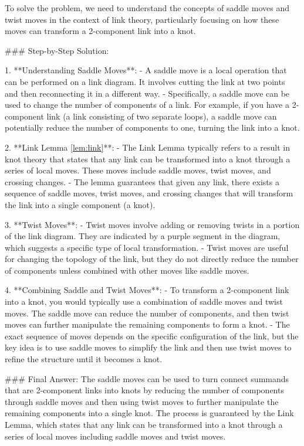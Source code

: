 To solve the problem, we need to understand the concepts of saddle moves and twist moves in the context of link theory, particularly focusing on how these moves can transform a 2-component link into a knot.

### Step-by-Step Solution:

1. **Understanding Saddle Moves**:
   - A saddle move is a local operation that can be performed on a link diagram. It involves cutting the link at two points and then reconnecting it in a different way.
   - Specifically, a saddle move can be used to change the number of components of a link. For example, if you have a 2-component link (a link consisting of two separate loops), a saddle move can potentially reduce the number of components to one, turning the link into a knot.

2. **Link Lemma \ref{lem:link}**:
   - The Link Lemma typically refers to a result in knot theory that states that any link can be transformed into a knot through a series of local moves. These moves include saddle moves, twist moves, and crossing changes.
   - The lemma guarantees that given any link, there exists a sequence of saddle moves, twist moves, and crossing changes that will transform the link into a single component (a knot).

3. **Twist Moves**:
   - Twist moves involve adding or removing twists in a portion of the link diagram. They are indicated by a purple segment in the diagram, which suggests a specific type of local transformation.
   - Twist moves are useful for changing the topology of the link, but they do not directly reduce the number of components unless combined with other moves like saddle moves.

4. **Combining Saddle and Twist Moves**:
   - To transform a 2-component link into a knot, you would typically use a combination of saddle moves and twist moves. The saddle move can reduce the number of components, and then twist moves can further manipulate the remaining components to form a knot.
   - The exact sequence of moves depends on the specific configuration of the link, but the key idea is to use saddle moves to simplify the link and then use twist moves to refine the structure until it becomes a knot.

### Final Answer:
The saddle moves can be used to turn connect summands that are 2-component links into knots by reducing the number of components through saddle moves and then using twist moves to further manipulate the remaining components into a single knot. The process is guaranteed by the Link Lemma, which states that any link can be transformed into a knot through a series of local moves including saddle moves and twist moves.

